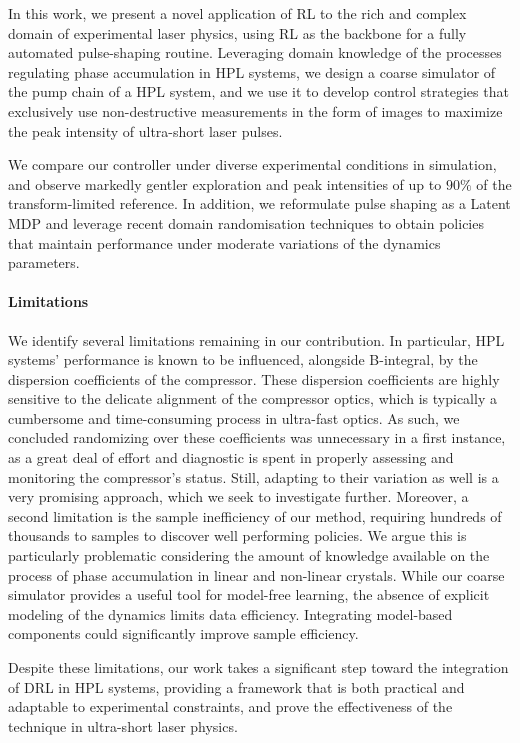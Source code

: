 In this work, we present a novel application of RL to the rich and complex domain of experimental laser physics, using RL as the backbone for a fully automated pulse-shaping routine. Leveraging domain knowledge of the processes regulating phase accumulation in HPL systems, we design a coarse simulator of the pump chain of a HPL system, and we use it to develop control strategies that exclusively use non-destructive measurements in the form of images to maximize the peak intensity of ultra-short laser pulses.

We compare our controller under diverse experimental conditions in simulation, and observe markedly gentler exploration and peak intensities of up to $90\%$ of the transform-limited reference. In addition, we reformulate pulse shaping as a Latent MDP and leverage recent domain randomisation techniques to obtain policies that maintain performance under moderate variations of the dynamics parameters.

\paragraph{Limitations}
We identify several limitations remaining in our contribution. In particular, HPL systems' performance is known to be influenced, alongside B-integral, by the dispersion coefficients of the compressor. These dispersion coefficients are highly sensitive to the delicate alignment of the compressor optics, which is typically a cumbersome and time-consuming process in ultra-fast optics. As such, we concluded randomizing over these coefficients was unnecessary in a first instance, as a great deal of effort and diagnostic is spent in properly assessing and monitoring the compressor's status. Still, adapting to their variation as well is a very promising approach, which we seek to investigate further. Moreover, a second limitation is the sample inefficiency of our method, requiring hundreds of thousands to samples to discover well performing policies. We argue this is particularly problematic considering the amount of knowledge available on the process of phase accumulation in linear and non-linear crystals. While our coarse simulator provides a useful tool for model-free learning, the absence of explicit modeling of the dynamics limits data efficiency. Integrating model-based components could significantly improve sample efficiency.

Despite these limitations, our work takes a significant step toward the integration of DRL in HPL systems, providing a framework that is both practical and adaptable to experimental constraints, and prove the effectiveness of the technique in ultra-short laser physics.